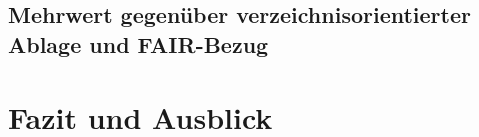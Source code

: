 \documentclass[12pt, a4paper, bibliography=totoc, listof=totoc]{scrreprt}
\begin{document}
\section{Mehrwert gegenüber verzeichnisorientierter Ablage und FAIR-Bezug}

\chapter{Fazit und Ausblick}

\printbibliography

\end{document}
